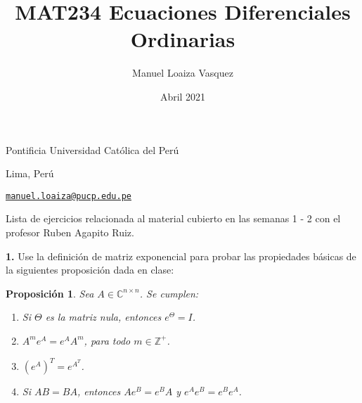\documentclass{article}
\title{MAT234 Ecuaciones Diferenciales Ordinarias}
\author{Manuel Loaiza Vasquez}
\date{Abril 2021}
\newenvironment{statement}[1]{\smallskip\noindent\color[rgb]{1.00,0.00,0.50} {\bf #1.}}{}
\newtheorem*{proposition}{Proposici\'on}
\theoremstyle{definition}
\theoremstyle{remark}
\newcommand{\BC}{\mathbb C}
\newcommand{\BZ}{\mathbb Z}
\begin{document}
\maketitle

\vspace*{-0.25in}
\centerline{Pontificia Universidad Cat\'olica del Per\'u}
\centerline{Lima, Per\'u}
\centerline{\href{mailto:manuel.loaiza@pucp.edu.pe}{{\tt manuel.loaiza@pucp.edu.pe}}}
\vspace*{0.15in}

\begin{framed}
  Lista de ejercicios relacionada al material cubierto en las semanas 1 - 2 con
  el profesor Ruben Agapito Ruiz.
\end{framed}

\begin{statement}{1}
  Use la definici\'on de matriz exponencial para probar las propiedades b\'asicas
  de la siguientes proposici\'on dada en clase:
\end{statement}

\begin{proposition}
  Sea $A \in \BC^{n \times n}$. Se cumplen:
  \begin{enumerate}
    \item Si $\Theta$ es la matriz nula, entonces $e^{\Theta} = I$.
    \item $A^m e^A = e^A A^m$, para todo $m \in \BZ^+$.
    \item $(e^A)^T = e^{A^T}$.
    \item Si $AB = BA$, entonces $A e^B = e^B A$ y $e^A e^B = e^B e^A$.
  \end{enumerate}
\end{proposition}
\end{document}
